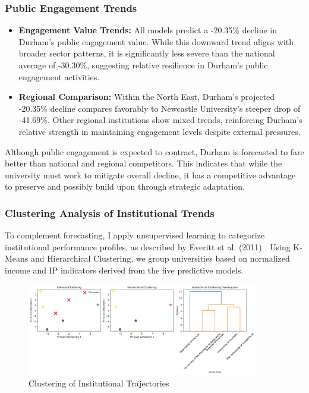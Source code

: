 \documentclass[journal,onecolumn, 10pt,draftclsnofoot]{IEEEtran}
\begin{document}
\subsubsection{Public Engagement Trends}

\begin{itemize}
    \item \textbf{Engagement Value Trends:} All models predict a -20.35\% decline in Durham's public engagement value. While this downward trend aligns with broader sector patterns, it is significantly less severe than the national average of -30.30\%, suggesting relative resilience in Durham's public engagement activities.
    
    \item \textbf{Regional Comparison:} Within the North East, Durham's projected -20.35\% decline compares favorably to Newcastle University's steeper drop of -41.69\%. Other regional institutions show mixed trends, reinforcing Durham's relative strength in maintaining engagement levels despite external pressures.
\end{itemize}

Although public engagement is expected to contract, Durham is forecasted to fare better than national and regional competitors. This indicates that while the university must work to mitigate overall decline, it has a competitive advantage to preserve and possibly build upon through strategic adaptation.

\subsubsection{Clustering Analysis of Institutional Trends}

To complement forecasting, I apply unsupervised learning to categorize institutional performance profiles, as described by Everitt et al. (2011) \cite{everitt2011cluster}. Using K-Means and Hierarchical Clustering, we group universities based on normalized income and IP indicators derived from the five predictive models.



\begin{figure}[h]
\centering
\includegraphics[width=0.9\textwidth]{Fig/figure44.clustering_analysis.png}
\caption{Clustering of Institutional Trajectories}
\label{fig:clustering-analysis}
\end{figure}
\end{document}
